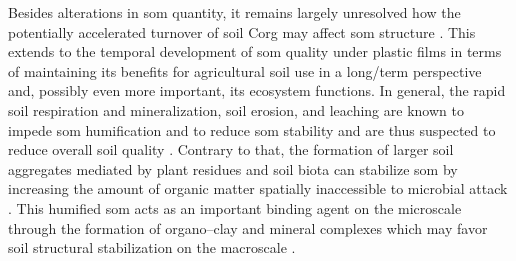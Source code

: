 Besides alterations in \ac{som} quantity, it remains largely unresolved how the potentially accelerated turnover of soil \ac{Corg} may affect \ac{som} structure \citep{DiaconoLongterm2010}. This extends to the temporal development of \ac{som} quality under plastic films in terms of maintaining its benefits for agricultural soil use in a long\-/term perspective \citep{DoranDefining1994} and, possibly even more important, its ecosystem functions. In general, the rapid soil respiration and mineralization, soil erosion, and leaching \citep{BolanDissolved2011} are known to impede \ac{som} humification and to reduce \ac{som} stability \citep{SollinsStabilization1996} and are thus suspected to reduce overall soil quality \citep{LalChallenges2009}. Contrary to that, the formation of larger soil aggregates mediated by plant residues and soil biota can stabilize \ac{som} by increasing the amount of organic matter spatially inaccessible to microbial attack \citep{SollinsStabilization1996,vonLutzowStabilization2006}. This humified \ac{som} acts as an important binding agent on the microscale through the formation of organo--clay and mineral complexes which may favor soil structural stabilization on the macroscale \citep{BronickSoil2005,ZhangEffects2015}.

